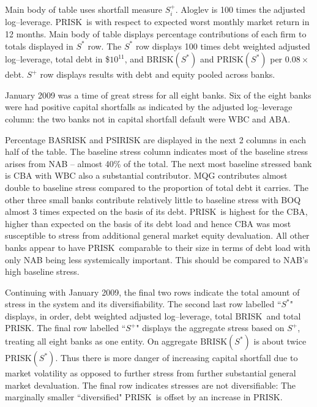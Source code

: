 \documentclass[authoryear]{elsarticle}
\newcommand{\br}{\ensuremath{\mathrm{BRISK}}}
\newcommand{\pr}{\ensuremath{\mathrm{PRISK}}}
\begin{document}
\begin{table}[ht]
\begin{threeparttable}
\begin{tabular}{l|rrrr|rrrr}
\end{tabular}
\begin{tablenotes}
\item[]Main body of table uses shortfall measure  $S_i^+$. Aloglev is 100 times the adjusted log--leverage. \pr\  is with respect to expected worst monthly market return  in 12 months.  Main body of table displays percentage contributions of each firm to totals displayed in $S^*$ row.   The $S^*$ row displays 100 times debt weighted adjusted log--leverage, total debt in \$$10^{11}$, and $\br(S^*)$  and $\pr(S^*)$ per $0.08\times$debt.  $S^+$ row displays results with debt and equity pooled across banks.
\end{tablenotes}
\end{threeparttable}
\end{table}
\normalsize


January 2009 was a time of great stress for all eight banks.       Six of the eight banks were had positive capital shortfalls as indicated by the adjusted log--leverage column:   the two banks not in capital shortfall default were WBC and ABA.

 Percentage BASRISK and PSIRISK are displayed in the next 2 columns in each half of the table.    The baseline stress column indicates most of the baseline stress arises from NAB -- almost 40\% of the total.   The next most baseline stressed bank is CBA with WBC also a substantial contributor.   MQG contributes almost double to baseline stress compared to the proportion of total debt  it carries.  The other three small banks contribute relatively little to baseline stress with BOQ  almost 3 times expected on the basis of its debt.   \pr\   is highest for the CBA, higher than expected on the basis of its debt load and hence CBA was most susceptible to stress from additional general market equity devaluation.    All other banks appear to have \pr\ comparable to their size in terms of debt load with only NAB being less systemically important.    This should be compared to NAB's high baseline stress.

Continuing with January 2009, the final two rows indicate the total amount of stress in the system and its diversifiability.
The second last  row labelled ``$S^*$"  displays, in order, debt weighted adjusted log--leverage, total \br\  and total \pr.   The final row labelled ``$S^+$" displays the aggregate stress based on $S^+$, treating all eight banks as one entity.
On aggregate \br$(S^*)$  is about twice \pr$(S^*)$.   Thus there is more danger of increasing capital shortfall due to market volatility  as opposed to further stress from further substantial general market devaluation.  The final row indicates stresses are not diversifiable:    The marginally  smaller  ``diversified"  \pr\ is offset by an increase in \pr.
\end{document}
